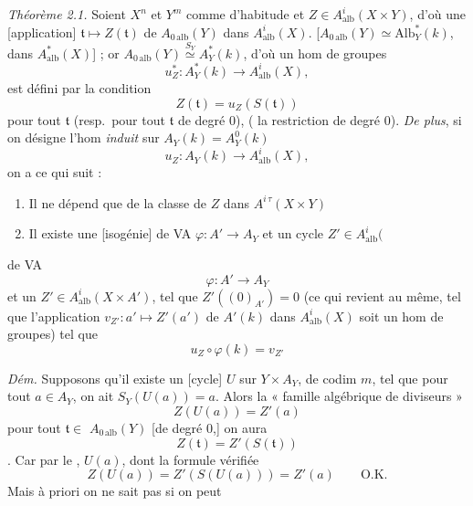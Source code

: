 \documentclass[11pt,a4paper]{article}
\begin{document}
\emph{Théorème 2.1.} Soient $X^{n}$ et $Y^{m}$ comme d'habitude et $Z \in
A^{i}_{\mathrm{alb}}(X \times Y)$, d'où une  [application]
$\mathfrak{t} \mapsto Z(\mathfrak{t})$ de 
$A_{0\,\mathrm{alb}}(Y)$ dans $A^{i}_{\mathrm{alb}}(X)$.  [$A_{0\,\mathrm{alb}}(Y) \simeq
\mathrm{Alb}^{*}_{Y}(k)$, dans $A^{*}_{\mathrm{alb}}(X)$]
 ; or
$A_{0\,\mathrm{alb}}(Y) \overset{S_Y}{\simeq} A^{*}_{Y}(k)$, d'où un hom de
groupes
\[
  u^{*}_{Z} : A^{*}_{Y}(k) \longrightarrow A^{i}_{\mathrm{alb}}(X),
\]
 est défini par la condition 
\[
  Z(\mathfrak{t}) = u_{Z}(S(\mathfrak{t}))
\]
pour tout $\mathfrak{t}$ (resp.\ pour tout $\mathfrak{t}$ de degré $0$),
( la restriction de degré $0$).
\emph{De plus}, si on désigne l'hom \emph{induit} sur $A_{Y}(k) =
A^{0}_{Y}(k)$
\[
  u_{Z} : A_{Y}(k) \longrightarrow A^{i}_{\mathrm{alb}}(X) ,
\]
on a ce qui suit : 
\begin{enumerate}
  \item[(i)] Il ne dépend que de la classe de $Z$ dans
  $A^{i\,\tau}(X \times Y)$ 
  \item[(ii)] Il existe une  [isogénie]  de VA
  $\varphi : A' \to A_{Y}$ et un cycle $Z' \in A^{i}_{\mathrm{alb}}($
\end{enumerate}

de VA
\[
  \varphi : A' \to A_{Y}
\]
et un $Z' \in A^{i}_{\mathrm{alb}}(X \times A')$,
 tel que $Z'((0)_{A'}) = 0$  (ce qui revient au même, tel que l'application
$v_{Z'} : a' \mapsto Z'(a')$ de $A'(k)$ dans
 $A^{i}_{\mathrm{alb}}(X)$ soit un hom de groupes) tel
que
\[
  u_{Z} \circ \varphi(k) = v_{Z'}
\]

\emph{Dém.} Supposons qu'il existe un  [cycle] $U$ sur $Y \times
A_{Y}$, de codim $m$, tel que pour tout $a \in A_{Y}$, on ait
$S_{Y}(U(a)) = a$. Alors la « famille algébrique de diviseurs »
 \ill{} \ill{}
\[
  Z(U(a)) = Z'(a)
\]
\ill{} \ill{} \ill{} pour tout $\mathfrak{t} \in$ \struck{\ill{}}
$A_{0\,\mathrm{alb}}(Y)$ [de degré $0$,] on aura
\[
  Z(\mathfrak{t}) = Z'(S(\mathfrak{t}))
\]
.
Car par le \ill{},  $U(a)$, dont la formule vérifiée
\[
  Z(U(a)) = Z'(S(U(a))) = Z'(a) \qquad \text{O.K.}
\]
Mais à priori on ne sait pas si on peut
\end{document}
